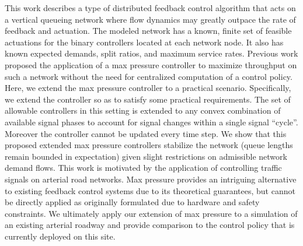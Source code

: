 This work describes a type of distributed feedback control algorithm that acts on a vertical queueing network where flow dynamics may greatly outpace the rate of feedback and actuation. The modeled network has a known, finite set of feasible actuations for the binary controllers located at each network node. It also has known expected demands, split ratios, and maximum service rates. Previous work proposed the application of a max pressure controller to maximize throughput on such a network without the need for centralized computation of a control policy. Here, we extend the max pressure controller to a practical scenario.
Specifically, we extend the controller so as to satisfy some practical requirements. The set of allowable controllers in this setting is extended to any convex combination of available signal phases to account for signal changes within a single signal ``cycle''. Moreover the controller cannot be updated every time step. We show that this proposed extended max pressure controllers stabilize the network (queue lengths remain bounded in expectation) given slight restrictions on admissible network demand flows.  
This work is motivated by the application of controlling traffic signals on arterial road networks. Max pressure provides an intriguing alternative to existing feedback control systems due to its theoretical guarantees, but cannot be directly applied as originally formulated due to hardware and safety constraints. We ultimately apply our extension of max pressure to a simulation of an existing arterial roadway and provide comparison to the control policy that is currently deployed on this site. 


